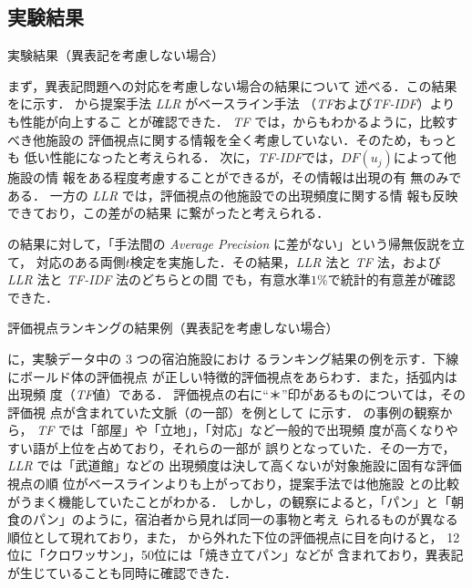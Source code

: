 \documentclass[japanese]{jnlp_1.4}
\def\eq#1{}
\def\tab#1{}
\begin{document}
\subsection{実験結果}
\label{sec:experiment1}

\begin{table}[b]
 \caption{実験結果（異表記を考慮しない場合）}
 \label{tab:ranking_result}

\end{table}

まず，異表記問題への対応を考慮しない場合の結果について
述べる．この結果を\tab{ranking_result}に示す．
\tab{ranking_result}から提案手法 \textit{LLR} がベースライン手法
    （\textit{TF}および\textit{TF-IDF}）よりも性能が向上するこ
    とが確認できた．
\textit{TF} では，\eq{tf}からもわかるように，比較すべき他施設の
評価視点に関する情報を全く考慮していない．そのため，もっとも
低い性能になったと考えられる．
次に，\textit{TF-IDF}では，$\mathit{DF}(u_j)$によって他施設の情
報をある程度考慮することができるが，その情報は出現の有
無のみである．
一方の \textit{LLR} では，評価視点の他施設での出現頻度に関する情
報も反映できており，この差が\tab{ranking_result}の結果
に繋がったと考えられる．

\tab{ranking_result}の結果に対して，「手法間の
\textit{Average Precision} に差がない」という帰無仮説を立て，
対応のある両側$t$検定を実施した．その結果，\textit{LLR} 法と
\textit{TF} 法，および \textit{LLR} 法と \textit{TF-IDF} 法のどちらとの間
でも，有意水準$1\%$で統計的有意差が確認できた．

\begin{table}[b]
 \caption{評価視点ランキングの結果例（異表記を考慮しない場合）}
 \label{tab:ranking_top}

\end{table}

\tab{ranking_top}に，実験データ中の 3 つの宿泊施設におけ
るランキング結果の例を示す．下線にボールド体の評価視点
が正しい特徴的評価視点をあらわす．また，括弧内は出現頻
度（\textit{TF}値）である．
評価視点の右に``＊''印があるものについては，その評価視
点が含まれていた文脈（の一部）を例として
\tab{ranking_top_example}に示す．
\tab{ranking_top}の事例の観察から，
\textit{TF} では「部屋」や「立地」，「対応」など一般的で出現頻
度が高くなりやすい語が上位を占めており，それらの一部が
誤りとなっていた．その一方で，\textit{LLR} では「武道館」などの
出現頻度は決して高くないが対象施設に固有な評価視点の順
位がベースラインよりも上がっており，提案手法では他施設
との比較がうまく機能していたことがわかる．
しかし，\tab{ranking_top}の観察によると，「パン」と「朝
  食のパン」のように，宿泊者から見れば同一の事物と考え
られるものが異なる順位として現れており，また，
\tab{ranking_top}から外れた下位の評価視点に目を向けると，
12位に「クロワッサン」，50位には「焼き立てパン」などが
含まれており，異表記が生じていることも同時に確認できた．
\end{document}
